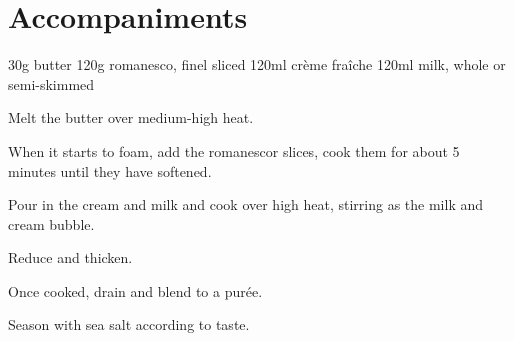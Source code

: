 \chapter{Accompaniments}
\minitoc

\label{rec:reomanesco-puree}
\begin{ingreds}
	30g butter
     	120g romanesco, finel sliced
	120ml cr\`eme fra\^iche
	120ml milk, whole or semi-skimmed
\end{ingreds}

\begin{method}
     	Melt the butter over medium-high heat.
		
	When it starts to foam, add the romanescor slices,  cook them for about 5 minutes until they have softened.

	Pour in the cream and milk and cook over high heat, stirring as the milk and cream bubble.

	Reduce and thicken.

	Once cooked, drain and blend to a pur\'ee.

	Season with sea salt according to taste.
\end {method}

